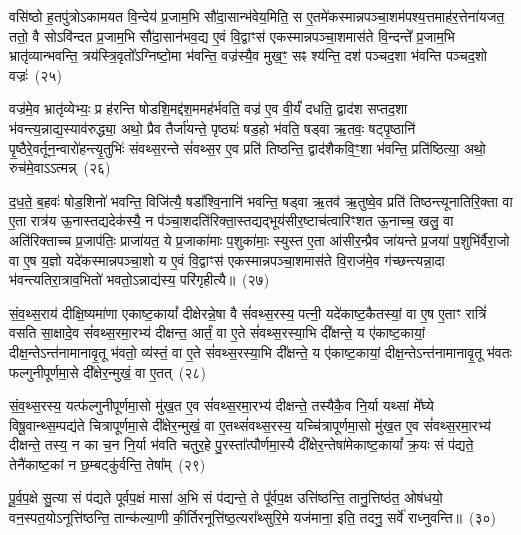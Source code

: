 {\anuvakamend[{अ॒ति॒रा॒त्र ओज॑स्ये॒व षट्त्रिꣳ॑शच्च}]}

वसि॑ष्ठो ह॒तपु॑त्रो\-ऽकामयत वि॒न्देय॑ प्र॒जाम॒भि सौ॑दा॒सान्भ॑वेय॒मिति॒ स ए॒तमे॑कस्मान्नपञ्चा॒शम॑पश्य॒त्तमाह॑र॒त्तेना॑यजत॒ ततो॒ वै सो\-ऽवि॑न्दत प्र॒जाम॒भि सौ॑दा॒सान॑भव॒द्य ए॒वं वि॒द्वाꣳस॑ एकस्मान्नपञ्चा॒शमास॑ते वि॒न्दन्ते᳚ प्र॒जाम॒भि भ्रातृ॑व्यान्भवन्ति॒ त्रय॑स्त्रि॒वृतो᳚\-ऽग्निष्टो॒मा भ॑वन्ति॒ वज्र॑स्यै॒व मुख॒ꣳ॒ सꣴ श्य॑न्ति॒ दश॑ पञ्चद॒शा भ॑वन्ति पञ्चद॒शो वज्रः॑~(२५)\ip

वज्र॑मे॒व भ्रातृ॑व्येभ्यः॒ प्र ह॑रन्ति षोडशि॒मद्द॑श॒ममह॑र्भवति॒ वज्र॑ ए॒व वी॒र्यं॑ दधति॒ द्वाद॑श सप्तद॒शा भ॑वन्त्य॒न्नाद्य॒स्याव॑रुद्ध्या॒ अथो॒ प्रैव तैर्जा॑यन्ते॒ पृष्ठ्यः॑ षड॒हो भ॑वति॒ षड्वा ऋ॒तवः॒ षट्पृ॒ष्ठानि॑ पृ॒ष्ठैरे॒वर्तून॒न्वारो॑हन्त्यृ॒तुभिः॑ संवथ्स॒रन्ते सं॑वथ्स॒र ए॒व प्रति॑ तिष्ठन्ति॒ द्वाद॑शैकवि॒ꣳ॒शा भ॑वन्ति॒ प्रति॑ष्ठित्या॒ अथो॒ रुच॑मे॒वा\-ऽऽ\-त्मन्न्~(२६)\ip

द॒ध॒ते॒ ब॒हवः॑ षोड॒शिनो॑ भवन्ति॒ विजि॑त्यै॒ षडा᳚श्वि॒नानि॑ भवन्ति॒ षड्वा ऋ॒तव॑ ऋ॒तुष्वे॒व प्रति॑ तिष्ठन्त्यूनातिरि॒क्ता वा ए॒ता रात्र॑य ऊ॒नास्तद्यदेक॑स्यै॒ न प॑ञ्चा॒शदति॑रिक्ता॒स्तद्यद्भूय॑सीर॒ष्टाच॑त्वारिꣳशत ऊ॒नाच्च॒ खलु॒ वा अति॑रिक्ताच्च प्र॒जा\-प॑तिः॒ प्राजा॑यत॒ ये प्र॒जाका॑माः प॒शुका॑माः॒ स्युस्त ए॒ता आ॑सीर॒न्प्रैव जा॑यन्ते प्र॒जया॑ प॒शुभि॑र्वैरा॒जो वा ए॒ष य॒ज्ञो यदे॑कस्मान्नपञ्चा॒शो य ए॒वं वि॒द्वाꣳस॑ एकस्मान्नपञ्चा॒शमास॑ते वि॒राज॑मे॒व ग॑च्छन्त्यन्ना॒दा भ॑वन्त्यतिरा॒त्राव॒भितो॑ भवतो॒\-ऽन्नाद्य॑स्य॒ परि॑गृहीत्यै॥~(२७)\ip

{\anuvakamend[{वज्र॑ आ॒त्मन्प्र॒जया॒ द्वाविꣳ॑शतिश्च}]}

सं॒व॒थ्स॒राय॑ दीक्षि॒ष्यमा॑णा एकाष्ट॒कायां᳚ दीक्षेरन्ने॒षा वै सं॑वथ्स॒रस्य॒ पत्नी॒ यदे॑काष्ट॒कैतस्यां॒ वा ए॒ष ए॒ताꣳ रात्रिं॑ वसति सा॒क्षादे॒व सं॑वथ्स॒रमा॒रभ्य॑ दीक्षन्त॒ आर्तं॒ वा ए॒ते सं॑वथ्स॒रस्या॒भि दी᳚क्षन्ते॒ य ए॑काष्ट॒कायां॒ दीक्ष॒न्ते\-ऽन्त॑नामानावृ॒तू भ॑वतो॒ व्य॑स्तं॒ वा ए॒ते सं॑वथ्स॒रस्या॒भि दी᳚क्षन्ते॒ य ए॑काष्ट॒कायां॒ दीक्ष॒न्ते\-ऽन्त॑नामानावृ॒तू भ॑वतः फल्गुनीपूर्णमा॒से दी᳚क्षेर॒न्मुखं॒ वा ए॒तत्~(२८)\ip

सं॒व॒थ्स॒रस्य॒ यत्फ॑ल्गुनीपूर्णमा॒सो मु॑ख॒त ए॒व सं॑वथ्स॒रमा॒रभ्य॑ दीक्षन्ते॒ तस्यैकै॒व नि॒र्या यथ्सां मे᳚घ्ये विषू॒वान्थ्स॒म्पद्य॑ते चित्रापूर्णमा॒से दी᳚क्षेर॒न्मुखं॒ वा ए॒तथ्सं॑वथ्स॒रस्य॒ यच्चि॑त्रापूर्णमा॒सो मु॑ख॒त ए॒व सं॑वथ्स॒रमा॒रभ्य॑ दीक्षन्ते॒ तस्य॒ न का च॒न नि॒र्या भ॑वति चतुर॒हे पु॒रस्ता᳚त्पौर्णमा॒स्यै दी᳚क्षेर॒न्तेषा॑मेकाष्ट॒कायां᳚ क्र॒यः सं प॑द्यते॒ तेनै॑काष्ट॒कां न छ॒म्बट्कु॑र्वन्ति॒ तेषा᳚म्~(२९)\ip

पू॒र्व॒प॒क्षे सु॒त्या सं प॑द्यते पूर्वप॒क्षं मासा॑ अ॒भि सं प॑द्यन्ते॒ ते पू᳚र्वप॒क्ष उत्ति॑ष्ठन्ति॒ तानु॒त्तिष्ठ॑त॒ ओष॑धयो॒ वन॒स्पत॒यो\-ऽनूत्ति॑ष्ठन्ति॒ तान्क॑ल्या॒णी की॒र्तिरनूत्ति॑ष्ठ॒त्यरा᳚थ्सुरि॒मे यज॑माना॒ इति॒ तदनु॒ सर्वे॑ राध्नुवन्ति॥~(३०)\ip

